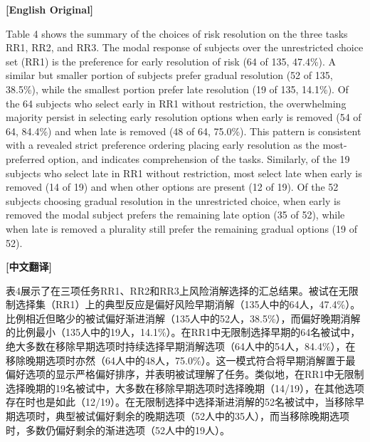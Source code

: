 \documentclass[12pt,a4paper]{ctexart}
\newenvironment{original}{%
  \par\medskip\noindent\textbf{[English Original]}\par\smallskip
  \color{black}\small
}{%
  \par\medskip
}
\newenvironment{translation}{%
  \par\noindent\textbf{[中文翻译]}\par\smallskip
  \color{blue}\small
}{%
  \par\bigskip
}
\theoremstyle{definition}
\theoremstyle{remark}
\begin{document}
\begin{original}
Table 4 shows the summary of the choices of risk resolution on the three tasks RR1, RR2, and RR3. The modal response of subjects over the unrestricted choice set (RR1) is the preference for early resolution of risk (64 of 135, 47.4\%). A similar but smaller portion of subjects prefer gradual resolution (52 of 135, 38.5\%), while the smallest portion prefer late resolution (19 of 135, 14.1\%). Of the 64 subjects who select early in RR1 without restriction, the overwhelming majority persist in selecting early resolution options when early is removed (54 of 64, 84.4\%) and when late is removed (48 of 64, 75.0\%). This pattern is consistent with a revealed strict preference ordering placing early resolution as the most-preferred option, and indicates comprehension of the tasks. Similarly, of the 19 subjects who select late in RR1 without restriction, most select late when early is removed (14 of 19) and when other options are present (12 of 19). Of the 52 subjects choosing gradual resolution in the unrestricted choice, when early is removed the modal subject prefers the remaining late option (35 of 52), while when late is removed a plurality still prefer the remaining gradual options (19 of 52).
\end{original}
\begin{translation}
表4展示了在三项任务RR1、RR2和RR3上风险消解选择的汇总结果。被试在无限制选择集（RR1）上的典型反应是偏好风险早期消解（135人中的64人，47.4\%）。比例相近但略少的被试偏好渐进消解（135人中的52人，38.5\%），而偏好晚期消解的比例最小（135人中的19人，14.1\%）。在RR1中无限制选择早期的64名被试中，绝大多数在移除早期选项时持续选择早期消解选项（64人中的54人，84.4\%），在移除晚期选项时亦然（64人中的48人，75.0\%）。这一模式符合将早期消解置于最偏好选项的显示严格偏好排序，并表明被试理解了任务。类似地，在RR1中无限制选择晚期的19名被试中，大多数在移除早期选项时选择晚期（14/19），在其他选项存在时也是如此（12/19）。在无限制选择中选择渐进消解的52名被试中，当移除早期选项时，典型被试偏好剩余的晚期选项（52人中的35人），而当移除晚期选项时，多数仍偏好剩余的渐进选项（52人中的19人）。
\end{translation}
\end{document}
